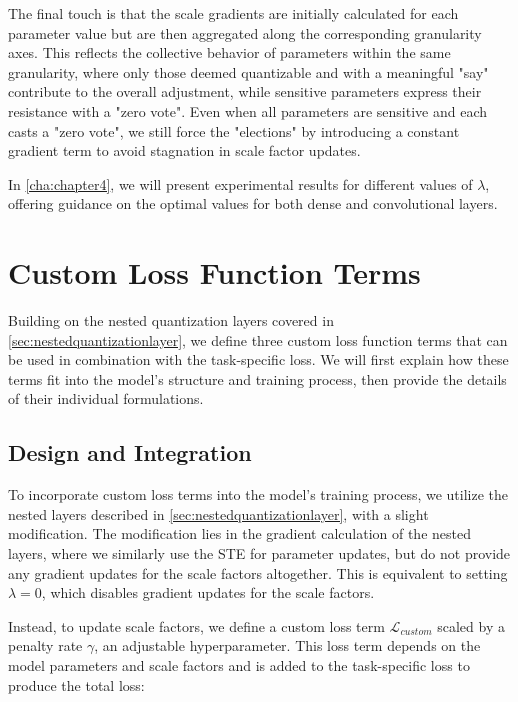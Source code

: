 The final touch is that the scale gradients are initially calculated for each parameter value
but are then aggregated along the corresponding granularity axes.
This reflects the collective behavior of parameters within the same granularity,
where only those deemed quantizable and with a meaningful "say" contribute to the overall adjustment,
while sensitive parameters express their resistance with a "zero vote".
Even when all parameters are sensitive and each casts a "zero vote", 
we still force the "elections" by introducing a constant gradient term
to avoid stagnation in scale factor updates.

In \cref{cha:chapter4}, we will present experimental results for different values of 
\( \lambda \), offering guidance on the optimal values for both dense and convolutional layers.


\section{Custom Loss Function Terms}
\label{sec:customloss}
\hspace*{1em}Building on the nested quantization layers covered in \cref{sec:nestedquantizationlayer},
we define three custom loss function terms that can be used in combination with the task-specific loss.
We will first explain how these terms fit into the model's structure and training process,
then provide the details of their individual formulations.

\subsection{Design and Integration}
\label{subsec:designandintegration}
To incorporate custom loss terms into the model's training process,
we utilize the nested layers described in \cref{sec:nestedquantizationlayer}, with a slight modification.
The modification lies in the gradient calculation of the nested layers,
where we similarly use the STE for parameter updates, but do not provide any gradient updates for the scale factors altogether.
This is equivalent to setting \( \lambda = 0\), which disables gradient updates for the scale factors.

Instead, to update scale factors, we define a custom loss term \( \mathcal{L}_{custom}\) scaled by a penalty rate \( \gamma \),
an adjustable hyperparameter. This loss term depends on the model parameters and scale factors
and is added to the task-specific loss to produce the total loss:

